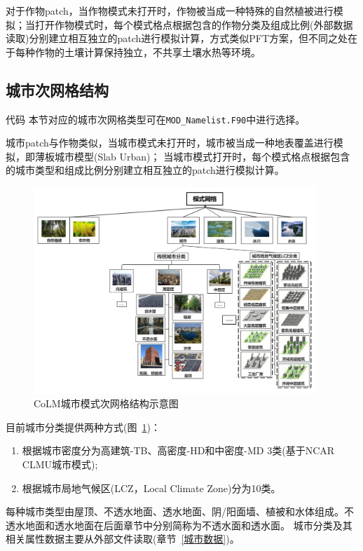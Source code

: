 对于作物patch，当作物模式未打开时，作物被当成一种特殊的自然植被进行模拟；当打开作物模式时，每个模式格点根据包含的作物分类及组成比例(外部数据读取)分别建立相互独立的patch进行模拟计算，方式类似PFT方案，但不同之处在于每种作物的土壤计算保持独立，不共享土壤水热等环境。

\subsection{城市次网格结构}
\begin{mymdframed}{代码}
  本节对应的城市次网格类型可在\texttt{MOD\_Namelist.F90}中进行选择。
\end{mymdframed}

城市patch与作物类似，当城市模式未打开时，城市被当成一种地表覆盖进行模拟，即薄板城市模型(Slab Urban)；
当城市模式打开时，每个模式格点根据包含的城市类型和组成比例分别建立相互独立的patch进行模拟计算。

{
  \begin{figure}[htbp]
    \centering
    \includegraphics[width=0.95\textwidth]{Figures/模式构架/CoLM城市次网格示意图.jpg}
    \caption[CoLM城市模式次网格结构示意图]{CoLM城市模式次网格结构示意图}
    \label{fig:城市次网格}
  \end{figure}
}

目前城市分类提供两种方式(图~\ref{fig:城市次网格})：
\begin{enumerate}
  \item 根据城市密度分为高建筑-TB、高密度-HD和中密度-MD 3类(基于NCAR CLMU城市模式);
  \item 根据城市局地气候区(LCZ，Local Climate Zone)分为10类。
\end{enumerate}
每种城市类型由屋顶、不透水地面、透水地面、阴/阳面墙、植被和水体组成。不透水地面和透水地面在后面章节中分别简称为不透水面和透水面。
城市分类及其相关属性数据主要从外部文件读取(章节~\ref{城市数据})。

